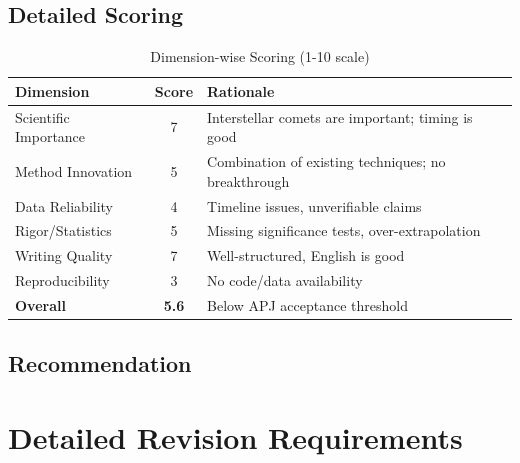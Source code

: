 \documentclass[12pt,a4paper]{article}
\begin{document}
\subsection{Detailed Scoring}

\begin{table}[h]
\centering
\caption{Dimension-wise Scoring (1-10 scale)}
\begin{tabular}{@{}lcp{8cm}@{}}
\toprule
\textbf{Dimension} & \textbf{Score} & \textbf{Rationale} \\
\midrule
Scientific Importance & 7 & Interstellar comets are important; timing is good \\
Method Innovation & 5 & Combination of existing techniques; no breakthrough \\
Data Reliability & 4 & Timeline issues, unverifiable claims \\
Rigor/Statistics & 5 & Missing significance tests, over-extrapolation \\
Writing Quality & 7 & Well-structured, English is good \\
Reproducibility & 3 & No code/data availability \\
\midrule
\textbf{Overall} & \textbf{5.6} & Below APJ acceptance threshold \\
\bottomrule
\end{tabular}
\end{table}

\subsection{Recommendation}

\begin{center}
\end{center}

\section{Detailed Revision Requirements}
\end{document}
